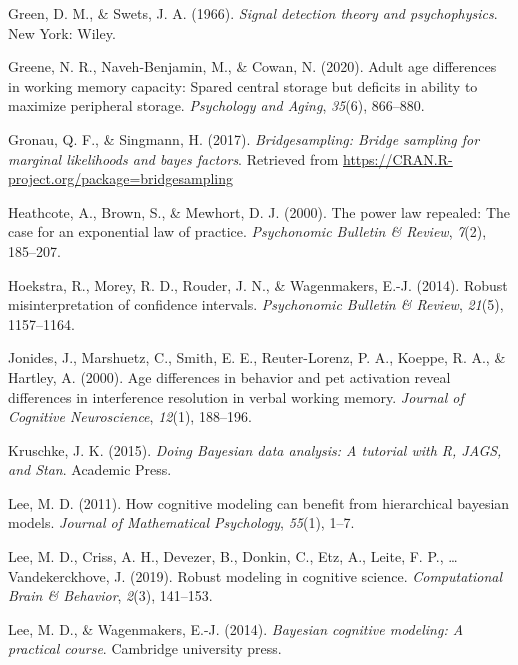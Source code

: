 \documentclass[
  english,
  ,man,floatsintext]{apa6}
\begin{document}
\leavevmode\hypertarget{ref-GreenAndSwets1966}{}%
Green, D. M., \& Swets, J. A. (1966). \emph{Signal detection theory and psychophysics}. New York: Wiley.

\leavevmode\hypertarget{ref-GreeneEtAl2020}{}%
Greene, N. R., Naveh-Benjamin, M., \& Cowan, N. (2020). Adult age differences in working memory capacity: Spared central storage but deficits in ability to maximize peripheral storage. \emph{Psychology and Aging}, \emph{35}(6), 866--880.

\leavevmode\hypertarget{ref-bridgesampling}{}%
Gronau, Q. F., \& Singmann, H. (2017). \emph{Bridgesampling: Bridge sampling for marginal likelihoods and bayes factors}. Retrieved from \url{https://CRAN.R-project.org/package=bridgesampling}

\leavevmode\hypertarget{ref-heathcote2000power}{}%
Heathcote, A., Brown, S., \& Mewhort, D. J. (2000). The power law repealed: The case for an exponential law of practice. \emph{Psychonomic Bulletin \& Review}, \emph{7}(2), 185--207.

\leavevmode\hypertarget{ref-HoekstraEtAl2014}{}%
Hoekstra, R., Morey, R. D., Rouder, J. N., \& Wagenmakers, E.-J. (2014). Robust misinterpretation of confidence intervals. \emph{Psychonomic Bulletin \& Review}, \emph{21}(5), 1157--1164.

\leavevmode\hypertarget{ref-jonides2000age}{}%
Jonides, J., Marshuetz, C., Smith, E. E., Reuter-Lorenz, P. A., Koeppe, R. A., \& Hartley, A. (2000). Age differences in behavior and pet activation reveal differences in interference resolution in verbal working memory. \emph{Journal of Cognitive Neuroscience}, \emph{12}(1), 188--196.

\leavevmode\hypertarget{ref-Kruschke2015}{}%
Kruschke, J. K. (2015). \emph{Doing Bayesian data analysis: A tutorial with R, JAGS, and Stan}. Academic Press.

\leavevmode\hypertarget{ref-lee2011cognitive}{}%
Lee, M. D. (2011). How cognitive modeling can benefit from hierarchical bayesian models. \emph{Journal of Mathematical Psychology}, \emph{55}(1), 1--7.

\leavevmode\hypertarget{ref-LeeEtAl2019}{}%
Lee, M. D., Criss, A. H., Devezer, B., Donkin, C., Etz, A., Leite, F. P., \ldots{} Vandekerckhove, J. (2019). Robust modeling in cognitive science. \emph{Computational Brain \& Behavior}, \emph{2}(3), 141--153.

\leavevmode\hypertarget{ref-lee2014bayesian}{}%
Lee, M. D., \& Wagenmakers, E.-J. (2014). \emph{Bayesian cognitive modeling: A practical course}. Cambridge university press.
\end{document}
